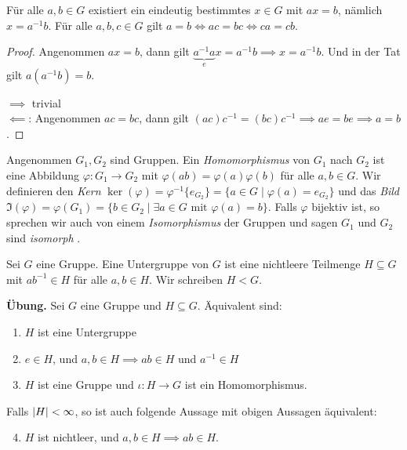 \begin{lemma}
	Für alle $a,b \in G$ existiert ein eindeutig bestimmtes $x \in G$ mit $ax = b$, nämlich $x = a^{-1} b$.
	Für alle $a,b,c \in G$ gilt $a=b \Leftrightarrow ac = bc \Leftrightarrow ca = cb$.
\end{lemma}

\begin{proof}
	Angenommen $ax=b$, dann gilt  $\underbrace{a^{-1} a}_{e} x = a^{-1} b \implies x = a^{-1} b$.
	Und in der Tat gilt $a (a^{-1} b) = b$. 

	$\implies$ trivial\\
	$\impliedby$: Angenommen $ac = bc$, dann gilt $(ac) c^{-1} = (bc) c^{-1} \implies ae = be \implies a = b$.
\end{proof}

\begin{definition}
	Angenommen $G_1, G_2$ sind Gruppen.
	Ein \emph{Homomorphismus} von $G_1$ nach $G_2$ ist eine Abbildung $\varphi: G_1 \to G_2$ mit
	$\varphi(ab) = \varphi(a) \varphi(b)$ für alle $a,b \in G$.
	Wir definieren den \emph{Kern} $\ker(\varphi) = \varphi^{-1} \{e_{G_2}\} = \{a \in G \mid \varphi(a) = e_{G_2}\} $
	und das \emph{Bild} $\Im(\varphi) = \varphi(G_1) = \{b \in G_2 \mid \exists a \in G \text{ mit } \varphi(a) = b\} $.
	Falls $\varphi$ bijektiv ist, so sprechen wir auch von einem \emph{Isomorphismus} der Gruppen
	und sagen $G_1$ und $G_2$ sind \emph{isomorph }.
\end{definition}

\begin{definition}
	Sei $G$ eine Gruppe. Eine Untergruppe von $G$ ist eine nichtleere Teilmenge $H \subseteq G$ mit $a b^{-1} \in H$ für alle $a,b \in H$. Wir schreiben $H < G$.
\end{definition}

\textbf{Übung.} Sei $G$ eine Gruppe und $H \subseteq G$. Äquivalent sind:
\begin{enumerate}[1)]
	\item $H$ ist eine Untergruppe
	\item $e \in H$, und $a,b \in H \implies ab \in H$ und $a^{-1} \in H$ 
	\item $H$ ist eine Gruppe und $\iota: H \to G$ ist ein Homomorphismus.
\end{enumerate}
Falls $\abs{H} < \infty$, so ist auch folgende Aussage mit obigen Aussagen äquivalent:
\begin{enumerate}[1)]
	\setcounter{enumi}{3}
	\item $H$ ist nichtleer, und $a,b \in H \implies ab \in H$.
\end{enumerate}


